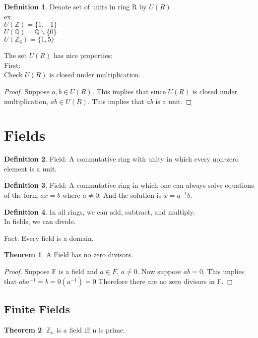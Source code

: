 \documentclass{article}
\theoremstyle{definition}
\newtheorem{definition}{Definition}[section]
\newtheorem{theorem}{Theorem}
\theoremstyle{remark}
\begin{document}
\begin{definition}
Denote set of units in ring R by $U(R)$\\
ex.\\
$U(\mathbb{Z}) = \{1, -1\}$\\
$U(\mathbb{Q}) = \mathbb{Q}\backslash \{0\}$\\
$U(\mathbb{Z}_6) = \{1, 5\}$
\end{definition}

The set $U(R)$ has nice properties:\\
First:\\
Check $U(R)$ is closed under multiplication.
\begin{proof}
Suppose $a, b \in U(R)$. This implies that since $U(R)$ is closed under multiplication, $ab\in U(R)$. This implies that $ab$ is a unit.
\end{proof}
\section{Fields}
\begin{definition}
Field: A commutative ring with unity in which every non-zero element is a unit.
\end{definition}
\begin{definition}
Field: A commutative ring in which one can always solve equations of the form $ax=b$ where $a\neq 0$. And the solution is $x = a^{-1}b$.
\end{definition}
\begin{definition}
In all rings, we can add, subtract, and multiply.\\
In fields, we can divide.
\end{definition}
Fact: Every field is a domain.
\begin{theorem}
A Field has no zero divisors.
\end{theorem}
\begin{proof}
Suppose F is a field and $a \in F$, $a \neq 0$. Now suppose $ab = 0$. This implies that $aba^{-1} = b = 0(a^{-1}) = 0$ Therefore there are no zero divisors in F.
\end{proof}

\subsection{Finite Fields}
\begin{theorem}
$\mathbb{Z}_n$ is a field iff n is prime.
\end{theorem}
\end{document}
